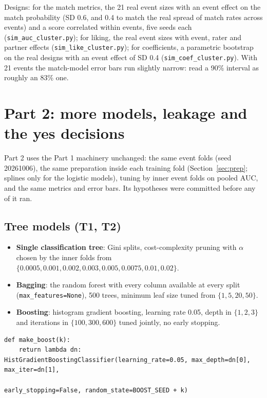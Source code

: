 \documentclass[11pt]{article}
\begin{document}
Designs: for the match metrics, the 21 real event sizes with an event effect on the match probability (SD 0.6, and
0.4 to match the real spread of match rates across events) and a score correlated within events, five seeds each
(\texttt{sim\_auc\_cluster.py}); for liking, the real event sizes with event, rater and partner effects
(\texttt{sim\_like\_cluster.py}); for coefficients, a parametric bootstrap on the real designs with an event effect of
SD 0.4 (\texttt{sim\_coef\_cluster.py}). With 21 events the match-model error bars run slightly narrow: read a 90\%
interval as roughly an 83\% one.

\section{Part 2: more models, leakage and the yes decisions}\label{sec:part2}

Part 2 uses the Part 1 machinery unchanged: the same event folds (seed 20261006), the same
preparation inside each training fold (Section~\ref{sec:prep}; splines only for the logistic models), tuning by inner
event folds on pooled AUC, and the same metrics and error bars. Its hypotheses were committed before any of it ran.

\subsection{Tree models (T1, T2)}

\begin{itemize}
\item \textbf{Single classification tree}: Gini splits, cost-complexity pruning with $\alpha$ chosen by the inner folds from
$\{0.0005, 0.001, 0.002, 0.003, 0.005, 0.0075, 0.01, 0.02\}$.
\item \textbf{Bagging}: the random forest with every column available at every split (\texttt{max\_features=None}),
500 trees, minimum leaf size tuned from $\{1, 5, 20, 50\}$.
\item \textbf{Boosting}: histogram gradient boosting, learning rate 0.05, depth in $\{1, 2, 3\}$ and iterations in
$\{100, 300, 600\}$ tuned jointly, no early stopping.
\end{itemize}

\begin{lstlisting}[caption={Boosting settings (scripts/part2\_models.py)}]
def make_boost(k):
    return lambda dn: HistGradientBoostingClassifier(learning_rate=0.05, max_depth=dn[0], max_iter=dn[1],
                                                     early_stopping=False, random_state=BOOST_SEED + k)
\end{lstlisting}
\end{document}
